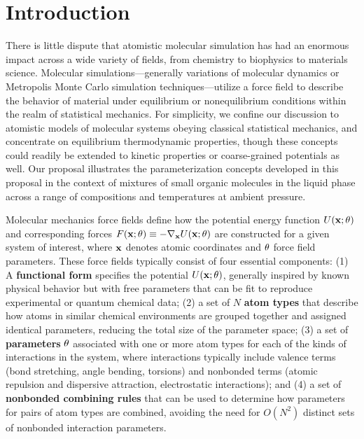 \documentclass[aps,pre,twocolumn,nofootinbib,superscriptaddress,linenumbers]{revtex4-1}
\begin{document}
\section{Introduction}

There is little dispute that atomistic molecular simulation has had an enormous impact across a wide variety of fields, from chemistry to biophysics to materials science.
Molecular simulations---generally variations of molecular dynamics or Metropolis Monte Carlo simulation techniques---utilize a force field to describe the behavior of material under equilibrium or nonequilibrium conditions within the realm of statistical mechanics.  
For simplicity, we confine our discussion to atomistic models of molecular systems obeying classical statistical mechanics, and concentrate on equilibrium thermodynamic properties, though these concepts could readily be extended to kinetic properties or coarse-grained potentials as well.
Our proposal illustrates the parameterization concepts developed in this proposal in the context of mixtures of small organic molecules in the liquid phase across a range of compositions and temperatures at ambient pressure.

Molecular mechanics force fields define how the potential energy function $U({\bf x};{\bf \theta})$ and corresponding forces $F({\bf x}; {\bf \theta}) \equiv -\nabla_{\bf x}U({\bf x}; {\bf \theta})$ are constructed for a given system of interest, where ${\bf x}$ denotes atomic coordinates and ${\bf \theta}$ force field parameters.
These force fields typically consist of four essential components:  
(1) A {\bf functional form} specifies the potential $U({\bf x}; {\bf \theta})$, generally inspired by known physical behavior but with free parameters that can be fit to reproduce experimental or quantum chemical data; (2) a set of $N$ {\bf atom types} that describe how atoms in similar chemical environments are grouped together and assigned identical parameters, reducing the total size of the parameter space; (3) a set of {\bf parameters} ${\bf \theta}$ associated with one or more atom types for each of the kinds of interactions in the system, where interactions typically include valence terms (bond stretching, angle bending, torsions) and nonbonded terms (atomic repulsion and dispersive attraction, electrostatic interactions); and (4) a set of {\bf nonbonded combining rules} that can be used to determine how parameters for pairs of atom types are combined, avoiding the need for $O(N^2)$ distinct sets of nonbonded interaction parameters.
\end{document}

